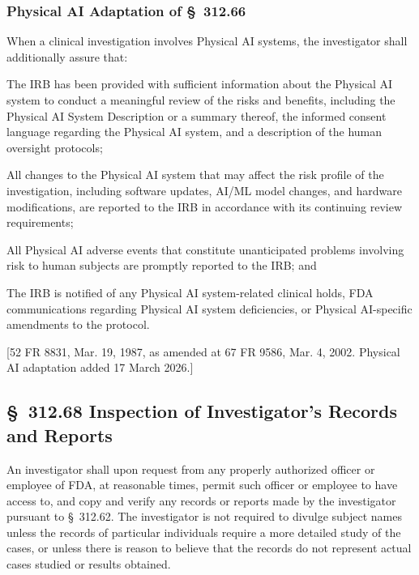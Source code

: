\documentclass[11pt]{article}
\begin{document}
\subsubsection{Physical AI Adaptation of \S~312.66}

When a clinical investigation involves Physical AI systems, the investigator shall additionally assure that:

\begin{description}[leftmargin=0.8cm,style=sameline]
\item[(a)] The IRB has been provided with sufficient information about the Physical AI system to conduct a meaningful review of the risks and benefits, including the Physical AI System Description or a summary thereof, the informed consent language regarding the Physical AI system, and a description of the human oversight protocols;
\item[(b)] All changes to the Physical AI system that may affect the risk profile of the investigation, including software updates, AI/ML model changes, and hardware modifications, are reported to the IRB in accordance with its continuing review requirements;
\item[(c)] All Physical AI adverse events that constitute unanticipated problems involving risk to human subjects are promptly reported to the IRB; and
\item[(d)] The IRB is notified of any Physical AI system-related clinical holds, FDA communications regarding Physical AI system deficiencies, or Physical AI-specific amendments to the protocol.
\end{description}

[52 FR 8831, Mar. 19, 1987, as amended at 67 FR 9586, Mar. 4, 2002. Physical AI adaptation added 17 March 2026.]

\subsection{\S~312.68 Inspection of Investigator's Records and Reports}

An investigator shall upon request from any properly authorized officer or employee of FDA, at reasonable times, permit such officer or employee to have access to, and copy and verify any records or reports made by the investigator pursuant to \S~312.62. The investigator is not required to divulge subject names unless the records of particular individuals require a more detailed study of the cases, or unless there is reason to believe that the records do not represent actual cases studied or results obtained.
\end{document}

